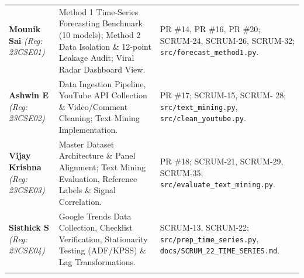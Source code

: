 \documentclass[aspectratio=169, 10pt]{beamer}
\begin{document}
\begin{frame}[t]
\begin{table}[h]
\begin{tabular}{p{3.2cm}p{5.8cm}p{4.0cm}}
                \textbf{Mounik Sai} \newline \textit{(Reg: 23CSE01)} & Method 1 Time-Series Forecasting Benchmark (10 models); Method 2 Data Isolation \& 12-point Leakage Audit; Viral Radar Dashboard
  View. & PR \#14, PR \#16, PR \#20; SCRUM-24, SCRUM-26, SCRUM-32; \texttt{src/forecast\_method1.py}. \\                                                                                               
                \addlinespace[2pt]                                                                                                                                                                     
                \textbf{Ashwin E} \newline \textit{(Reg: 23CSE02)} & Data Ingestion Pipeline, YouTube API Collection \& Video/Comment Cleaning; Text Mining Implementation. & PR \#17; SCRUM-15, SCRUM-
  28; \texttt{src/text\_mining.py}, \texttt{src/clean\_youtube.py}. \\                                                                                                                                 
                \addlinespace[2pt]                                                                                                                                                                     
                \textbf{Vijay Krishna} \newline \textit{(Reg: 23CSE03)} & Master Dataset Architecture \& Panel Alignment; Text Mining Evaluation, Reference Labels \& Signal Correlation. & PR \#18;   
  SCRUM-21, SCRUM-29, SCRUM-35; \texttt{src/evaluate\_text\_mining.py}. \\                                                                                                                             
                \addlinespace[2pt]                                                                                                                                                                     
                \textbf{Sisthick S} \newline \textit{(Reg: 23CSE04)} & Google Trends Data Collection, Checklist Verification, Stationarity Testing (ADF/KPSS) \& Lag Transformations. & SCRUM-13,      
  SCRUM-22; \texttt{src/prep\_time\_series.py}, \texttt{docs/SCRUM\_22\_TIME\_SERIES.md}. \\                                                                                                           
                \addlinespace[2pt]                                                                                                                                                                     

\end{tabular}
\end{table}
\end{frame}
\end{document}
